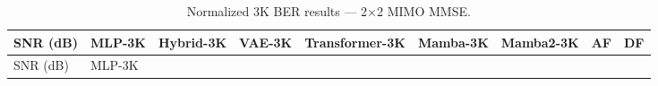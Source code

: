 \documentclass[
  english,
  12pt,
  12pt,
  a4paper,
  oneside]{report}
\begin{document}
\begin{longtable}[]{@{}
  >{\raggedright\arraybackslash}p{}
  >{\raggedright\arraybackslash}p{}
  >{\raggedright\arraybackslash}p{}
  >{\raggedright\arraybackslash}p{}
  >{\raggedright\arraybackslash}p{}
  >{\raggedright\arraybackslash}p{}
  >{\raggedright\arraybackslash}p{}
  >{\raggedright\arraybackslash}p{}
  >{\raggedright\arraybackslash}p{}@{}}
\caption{Normalized 3K BER results --- 2×2 MIMO MMSE.}\label{tbl:table11}\tabularnewline
\toprule\noalign{}
\begin{minipage}[b]{\linewidth}\raggedright
SNR (dB)
\end{minipage} & \begin{minipage}[b]{\linewidth}\raggedright
MLP-3K
\end{minipage} & \begin{minipage}[b]{\linewidth}\raggedright
Hybrid-3K
\end{minipage} & \begin{minipage}[b]{\linewidth}\raggedright
VAE-3K
\end{minipage} & \begin{minipage}[b]{\linewidth}\raggedright
Transformer-3K
\end{minipage} & \begin{minipage}[b]{\linewidth}\raggedright
Mamba-3K
\end{minipage} & \begin{minipage}[b]{\linewidth}\raggedright
Mamba2-3K
\end{minipage} & \begin{minipage}[b]{\linewidth}\raggedright
AF
\end{minipage} & \begin{minipage}[b]{\linewidth}\raggedright
DF
\end{minipage} \\
\midrule\noalign{}
\endfirsthead
\toprule\noalign{}
\begin{minipage}[b]{\linewidth}\raggedright
SNR (dB)
\end{minipage} & \begin{minipage}[b]{\linewidth}\raggedright
MLP-3K
\end{minipage} & \begin{minipage}[b]{\linewidth}\raggedright

\end{minipage}
\end{longtable}
\end{document}
